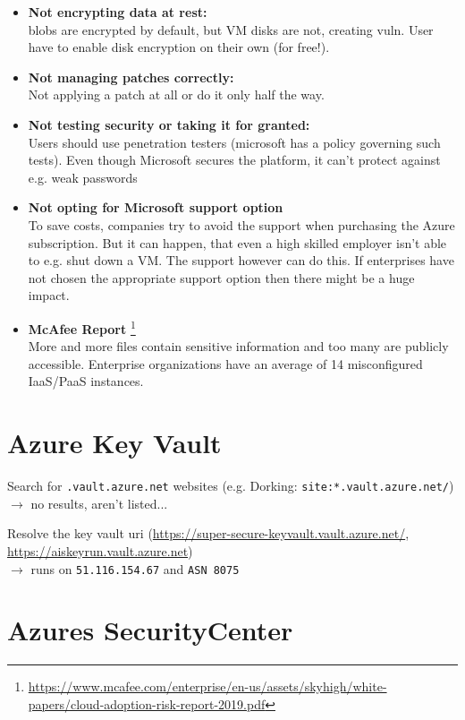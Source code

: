 \documentclass[12pt]{article}
\begin{document}
\begin{itemize}
    \item \textbf{Not encrypting data at rest:} \footnotemark[3] \\ 
    blobs are encrypted by default, but VM disks are not, creating vuln. User have to enable disk encryption on their own (for free!).
    
    \item \textbf{Not managing patches correctly:} \footnotemark[4] \\
    Not applying a patch at all or do it only half the way.
    
    \item \textbf{Not testing security or taking it for granted:} \footnotemark[4] \footnotemark[1] \\ 
    Users should use penetration testers (microsoft has a policy governing such tests).
    Even though Microsoft secures the platform, it can't protect against e.g. weak passwords
    
    \item \textbf{Not opting for Microsoft support option} \footnotemark[1] \\
    To save costs, companies try to avoid the support when purchasing the Azure subscription. 
    But it can happen, that even a high skilled employer isn't able to e.g. shut down a VM. The support however can do this. If enterprises have not chosen the appropriate support option then there might be a huge impact. 
    
    \item \textbf{McAfee Report} \footnote{\url{https://www.mcafee.com/enterprise/en-us/assets/skyhigh/white-papers/cloud-adoption-risk-report-2019.pdf}} \\
    More and more files contain sensitive information and too many are publicly accessible. Enterprise organizations have an average of 14 misconfigured IaaS/PaaS instances.
    
\end{itemize}


\newpage
\section*{Azure Key Vault}


Search for \verb|.vault.azure.net| websites (e.g. Dorking: \verb|site:*.vault.azure.net/|)\\
$\rightarrow$ no results, aren't listed...

Resolve the key vault uri (\url{https://super-secure-keyvault.vault.azure.net/}, \url{https://aiskeyrun.vault.azure.net}) \\
$\rightarrow$ runs on \verb|51.116.154.67| and \verb|ASN 8075|


\section*{Azures SecurityCenter}
\end{document}
